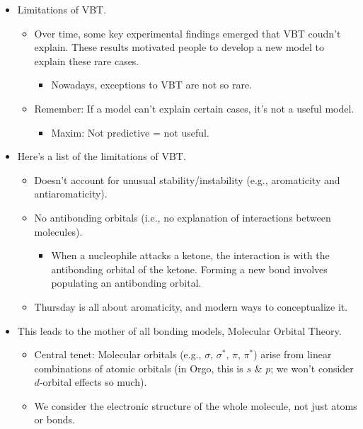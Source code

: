 \documentclass[../notes.tex]{subfiles}
\begin{document}
\begin{itemize}
    \item Limitations of VBT.
    \begin{itemize}
        \item Over time, some key experimental findings emerged that VBT coudn't explain. These results motivated people to develop a new model to explain these rare cases.
        \begin{itemize}
            \item Nowadays, exceptions to VBT are not so rare.
        \end{itemize}
        \item Remember: If a model can't explain certain cases, it's not a useful model.
        \begin{itemize}
            \item Maxim: Not predictive = not useful.
        \end{itemize}
    \end{itemize}
    \item Here's a list of the limitations of VBT.
    \begin{itemize}
        \item Doesn't account for unusual stability/instability (e.g., aromaticity and antiaromaticity).
        \item No antibonding orbitals (i.e., no explanation of interactions between molecules).
        \begin{itemize}
            \item When a nucleophile attacks a ketone, the interaction is with the antibonding orbital of the ketone. Forming a new bond involves populating an antibonding orbital.
        \end{itemize}
        \item Thursday is all about aromaticity, and modern ways to conceptualize it.
    \end{itemize}
    \pagebreak
    \item This leads to the mother of all bonding models, Molecular Orbital Theory.
    \begin{itemize}
        \item Central tenet: Molecular orbitals (e.g., $\sigma$, $\sigma^*$, $\pi$, $\pi^*$) arise from linear combinations of atomic orbitals (in Orgo, this is $s$ \& $p$; we won't consider $d$-orbital effects so much).
        \item We consider the electronic structure of the whole molecule, not just atoms or bonds.
        \begin{itemize}

\end{itemize}
\end{itemize}
\end{itemize}
\end{document}
